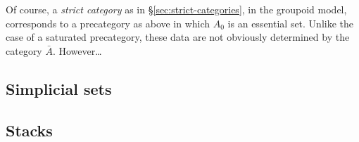 Of course, a \emph{strict category} as in \S\ref{sec:strict-categories}, in the groupoid model, corresponds to a precategory as above in which $A_0$ is an essential set.
Unlike the case of a saturated precategory, these data are not obviously determined by the category $\bar A$.
However\dots


\subsection{Simplicial sets}
\label{sec:simplicial-sets}


\subsection{Stacks}
\label{sec:stacks}




